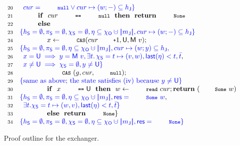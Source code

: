 {\begin{figure}
\[{{\begin{array}{rl}
\Num{20} & \specK{\hphantom{\}}cur = \esc{null} \vee cur \mapsto (w; -) \subseteq \heapj\}}\\
\Num{21} & ~~~~ ~~~~ \kw{if}~~cur~\esc{==}~\esc{null}~~\kw{then}~~\kw{return}~{\esc{None}}\\
\Num{22} & ~~~~ ~~~~ \kw{else}\\
\Num{23} & \specK{\{\heaps = \emptyset, \perms = \emptyset, \hists = \emptyset, \gist \subseteq \histo \hunion \mygather{\pending}, cur \mapsto (w; -) \subseteq \heapj\}}\\
\Num{24} & ~~~~ ~~~~ ~~~~ x \Asgn \esc{CAS}(cur\esc{+}1, \Unmatched, \Matched v);\\
\Num{25} & \specK{\{\heaps = \emptyset, \perms = \emptyset, \gist \subseteq \histo \hunion \mygather{\pending}, cur \mapsto (w; y) \subseteq \heapj,} \\
\Num{26} & \specK{\hphantom{\}}x = \Unmatched \implies y = \Matched v, \exists t\ldot \hists = t \mapsto (v, w), \mathsf{last}(\gist) < t, \twin t},\\
\Num{27} & \specK{\hphantom{\}}x \neq \Unmatched \implies \hists = \emptyset, y \neq \Unmatched \}}\\
\Num{28} & ~~~~ ~~~~ ~~~~ \esc{CAS}~(g, cur, \esc{null});\\
\Num{29} & \specK{\{\mbox{same as above; the state satisfies (iv) because $y \neq \Unmatched$}\}}\\
\Num{30} & ~~~~ ~~~~ ~~~~ \kw{if}~~x~\esc{==}~\Unmatched~~\kw{then}~~w\Asgn \esc{read}~cur;\kw{return}~(\esc{Some}\ w)\\
\Num{31} & \specK{\{ \heaps = \emptyset, \perms = \emptyset, \gist \subseteq \histo \hunion \mygather{\pending}, \res=\esc{Some}\ w}, \\
\Num{32} & \specK{\hphantom{\}}\exists t. \hists = t \mapsto (w, v), \mathsf{last}(\gist) < t, \twin t\}}\\
\Num{33} & ~~~~ ~~~~ ~~~~ \kw{else}~~\kw{return}~\esc{None}\}\\
\Num{34} & \specK{\{\heaps = \emptyset, \perms = \emptyset, \hists = \emptyset, \gist \subseteq \histo \hunion \mygather{\pending}, \res=\esc{None}\}} 
\end{array}
}}
\]
\caption{Proof outline for the exchanger.}
\label{fig:exchanger_proof}
\end{figure} 
}

